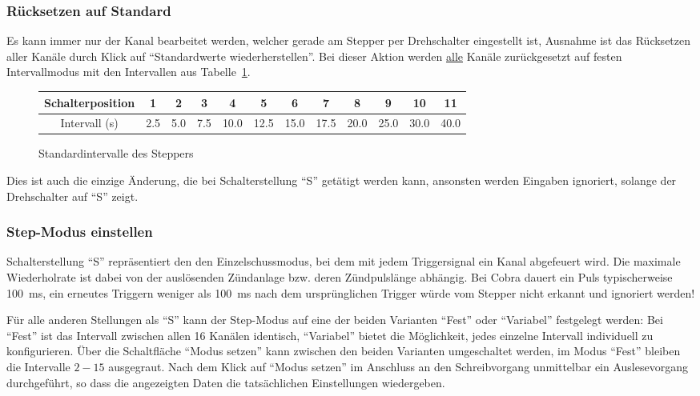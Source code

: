 \documentclass[paper=a4, open=any, numbers=noenddot]{scrbook}
\begin{document}
				\subsubsection*{Rücksetzen auf Standard}
					Es kann immer nur der Kanal bearbeitet werden, welcher gerade am Stepper per Drehschalter eingestellt ist, Ausnahme ist das Rücksetzen aller Kanäle durch Klick auf \enquote{Standardwerte wiederherstellen}. Bei dieser Aktion werden \underline{alle} Kanäle zurückgesetzt auf festen Intervallmodus mit den Intervallen aus Tabelle~\ref{tab:standardintervalle}.

					\begin{figure}
						\begin{center}
							\begin{longtabu}
								[c]{c|*{11}c}
								Schalterposition & 1   & 2   & 3   & 4    & 5    & 6    & 7    & 8    & 9    & 10   & 11   \\ \hline
								Intervall (s)    & 2.5 & 5.0 & 7.5 & 10.0 & 12.5 & 15.0 & 17.5 & 20.0 & 25.0 & 30.0 & 40.0
							\end{longtabu}
						\end{center}
						\caption{Standardintervalle des Steppers}
						\label{tab:standardintervalle}
					\end{figure}

					Dies ist auch die einzige Änderung, die bei Schalterstellung \enquote{S} getätigt werden kann, ansonsten werden Eingaben ignoriert, solange der Drehschalter auf \enquote{S} zeigt.

				\subsubsection*{Step-Modus einstellen}

					Schalterstellung \enquote{S} repräsentiert den den Einzelschussmodus, bei dem mit jedem Triggersignal ein Kanal abgefeuert wird. Die maximale Wiederholrate ist dabei von der auslösenden Zündanlage bzw. deren Zündpulslänge abhängig. Bei Cobra dauert ein Puls typischerweise \SI{100}{\milli\second}, ein erneutes Triggern weniger als \SI{100}{\milli\second} nach dem ursprünglichen Trigger würde vom Stepper nicht erkannt und ignoriert werden!

					Für alle anderen Stellungen als \enquote{S} kann der Step-Modus auf eine der beiden Varianten \enquote{Fest} oder \enquote{Variabel} festgelegt werden: Bei \enquote{Fest} ist das Intervall zwischen allen 16 Kanälen identisch, \enquote{Variabel} bietet die Möglichkeit, jedes einzelne Intervall individuell zu konfigurieren. Über die Schaltfläche \enquote{Modus setzen} kann zwischen den beiden Varianten umgeschaltet werden, im Modus \enquote{Fest} bleiben die Intervalle $2-15$ ausgegraut. Nach dem Klick auf \enquote{Modus setzen} im Anschluss an den Schreibvorgang unmittelbar ein Auslesevorgang durchgeführt, so dass die angezeigten Daten die tatsächlichen Einstellungen wiedergeben.
\end{document}
